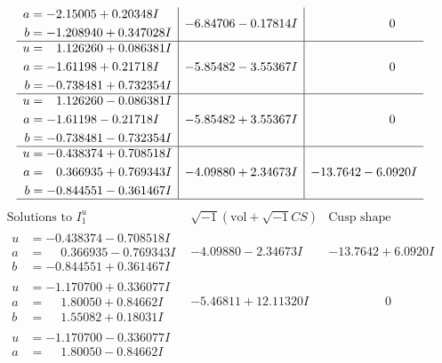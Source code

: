 \documentclass[1p]{elsarticle_modified}
\theoremstyle{definition}
\newcommand{\I}{\sqrt{-1}}
\begin{document}
$$\begin{array}{c|c|c}
\begin{aligned}
a &= -2.15005 + 0.20348 I \\
b &= -1.208940 + 0.347028 I\end{aligned}
 & -6.84706 - 0.17814 I & \phantom{-0.000000 } 0 \\ \hline\begin{aligned}
u &= \phantom{-}1.126260 + 0.086381 I \\
a &= -1.61198 + 0.21718 I \\
b &= -0.738481 + 0.732354 I\end{aligned}
 & -5.85482 - 3.55367 I & \phantom{-0.000000 } 0 \\ \hline\begin{aligned}
u &= \phantom{-}1.126260 - 0.086381 I \\
a &= -1.61198 - 0.21718 I \\
b &= -0.738481 - 0.732354 I\end{aligned}
 & -5.85482 + 3.55367 I & \phantom{-0.000000 } 0 \\ \hline\begin{aligned}
u &= -0.438374 + 0.708518 I \\
a &= \phantom{-}0.366935 + 0.769343 I \\
b &= -0.844551 - 0.361467 I\end{aligned}
 & -4.09880 + 2.34673 I & -13.7642 - 6.0920 I\\
 \hline 
 \end{array}$$\newpage$$\begin{array}{c|c|c}  
\text{Solutions to }I^u_{1}& \I (\text{vol} + \sqrt{-1}CS) & \text{Cusp shape}\\
 \hline 
\begin{aligned}
u &= -0.438374 - 0.708518 I \\
a &= \phantom{-}0.366935 - 0.769343 I \\
b &= -0.844551 + 0.361467 I\end{aligned}
 & -4.09880 - 2.34673 I & -13.7642 + 6.0920 I \\ \hline\begin{aligned}
u &= -1.170700 + 0.336077 I \\
a &= \phantom{-}1.80050 + 0.84662 I \\
b &= \phantom{-}1.55082 + 0.18031 I\end{aligned}
 & -5.46811 + 12.11320 I & \phantom{-0.000000 } 0 \\ \hline\begin{aligned}
u &= -1.170700 - 0.336077 I \\
a &= \phantom{-}1.80050 - 0.84662 I \\

\end{aligned}
\end{array}$$
\end{document}
